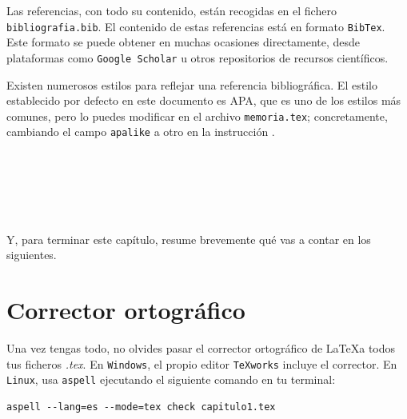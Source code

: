 			Las referencias, con todo su contenido, están recogidas en el fichero \texttt{bibliografia.bib}. El contenido de estas referencias está en formato \texttt{BibTex}. Este formato se puede obtener en muchas ocasiones directamente, desde plataformas como \texttt{Google Scholar} u otros repositorios de recursos científicos.
			
			Existen numerosos estilos para reflejar una referencia bibliográfica. El estilo establecido por defecto en este documento es APA, que es uno de los estilos más comunes, pero lo puedes modificar en el archivo \texttt{memoria.tex}; concretamente, cambiando el campo \verb|apalike| a otro en la instrucción \verb||. 
			
			\
			
			\
			
			\
			
			Y, para terminar este capítulo, resume brevemente qué vas a contar en los siguientes.


\section{Corrector ortográfico}

Una vez tengas todo, no olvides pasar el corrector ortográfico de \LaTeX a todos tus ficheros \textit{.tex}. En \texttt{Windows}, el propio editor \texttt{TeXworks} incluye el corrector. En \texttt{Linux}, usa \texttt{aspell} ejecutando el siguiente comando en tu terminal:

\begin{verbatim}
aspell --lang=es --mode=tex check capitulo1.tex
\end{verbatim}
